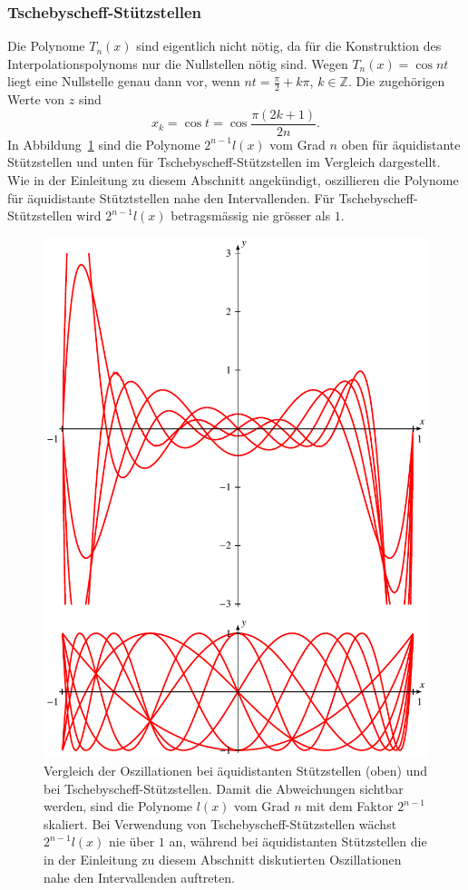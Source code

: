 \subsubsection{Tschebyscheff-Stützstellen}
Die Polynome $T_n(x)$ sind eigentlich nicht nötig, da für die Konstruktion
des Interpolationspolynoms nur die Nullstellen nötig sind.
Wegen $T_n(x)=\cos nt$ liegt eine Nullstelle genau dann vor, wenn
$nt = \frac{\pi}2 + k\pi$, $k\in\mathbb Z$.
Die zugehörigen Werte von $z$ sind
\[
x_k
=
\cos t = \cos\frac{\pi(2k+1)}{2n}.
\]
In Abbildung~\ref{buch:figure:tschebyscheff-vergleich} sind 
die Polynome $2^{n-1}l(x)$ vom Grad $n$ oben für äquidistante Stützstellen
und unten für Tschebyscheff-Stützstellen im Vergleich dargestellt.
Wie in der Einleitung zu diesem Abschnitt angekündigt, oszillieren die
Polynome für äquidistante Stütztstellen nahe den Intervallenden.
Für Tschebyscheff-Stützstellen wird $2^{n-1}l(x)$ betragsmässig nie
grösser als $1$.
\begin{figure}
\centering
\includegraphics{chapters/30-interpolation/figures/vergleich.pdf}
\caption{Vergleich der Oszillationen bei äquidistanten Stützstellen (oben)
und bei Tschebyscheff-Stützstellen.
Damit die Abweichungen sichtbar werden, sind die Polynome $l(x)$ vom Grad
$n$ mit dem Faktor $2^{n-1}$ skaliert.
Bei Verwendung von Tscheby\-scheff-Stützstellen wächst $2^{n-1}l(x)$
nie über $1$ an, während bei äquidistanten Stützstellen die in der
Einleitung zu diesem Abschnitt diskutierten Oszillationen nahe den
Intervallenden auftreten.
\label{buch:figure:tschebyscheff-vergleich}}
\end{figure}


